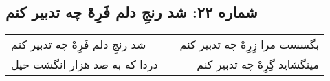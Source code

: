 \begin{center}
\section*{شماره ۲۲: شد رنجِ دلم فَرِهْ چه تدبیر کنم}
\label{sec:022}
\begin{longtable}{l p{0.5cm} r}
شد رنجِ دلم فَرِهْ چه تدبیر کنم
&&
بگسست مرا زِرِهْ چه تدبیر کنم
\\
دردا که به صد هزار انگشت حیل
&&
مینگشاید گِرِهْ چه تدبیر کنم
\\
\end{longtable}
\end{center}

